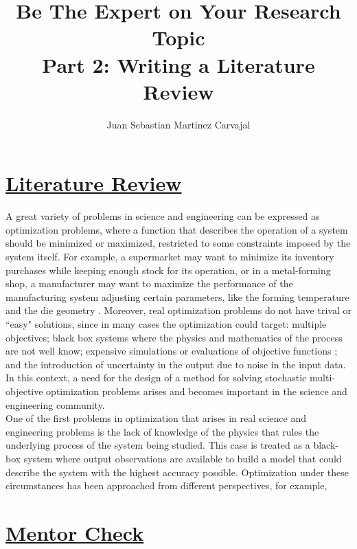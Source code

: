 \documentclass{journal}
\title{\textbf{Be The Expert on Your Research Topic}\\Part 2: Writing a Literature Review}
\author{Juan Sebastian Martinez Carvajal}
\date{}
\begin{document}
\maketitle
\hrulefill

\section{\underline{Literature Review}}

A great variety of problems in science and engineering can be expressed as optimization problems, where a function that describes the operation of a system should be minimized or maximized, restricted to some constraints imposed by the system itself. For example, a supermarket may want to minimize its inventory purchases while keeping enough stock for its operation, or in a metal-forming shop, a manufacturer may want to maximize the performance of the manufacturing system adjusting certain parameters, like the forming temperature and the die geometry \cite{Huang2006}. Moreover, real optimization problems do not have trival or ``easy" solutions, since in many cases the optimization could target: multiple objectives; black box systems where the physics and mathematics of the process are not well know; expensive simulations or evaluations of objective functions \cite{Jones1998}; and the introduction of uncertainty in the output due to noise in the input data. In this context, a need for the design of a method for solving stochastic multi-objective optimization problems arises and becomes important in the science and engineering community.\\

One of the first problems in optimization that arises in real science and engineering problems is the lack of knowledge of the physics that rules the underlying process of the system being studied. This case is treated as a black-box system where output observations are available to build a model that could describe the system with the highest accuracy possible. Optimization under these circumstances has been approached from different perspectives, for example, 

\section{\underline{Mentor Check}}



\end{document}
